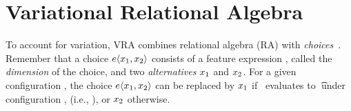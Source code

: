 \section{Variational Relational Algebra}
\label{sec:vrel-alg}

%


To account for variation, VRA combines relational algebra (RA) with 
\emph{choices}~\cite{EW11tosem,HW16fosd,Walk13thesis}.
Remember that a choice $\chc{\elem_1,\elem_2}$ consists of a feature expression \dimMeta, called
the \emph{dimension} of the choice, and 
two \emph{alternatives} $\elem_1$ and $\elem_2$. For a given configuration \config, 
the choice $\chc{\elem_1, \elem_2}$ can be replaced by $\elem_1$ if \dimMeta\
evaluates to \t\ under configuration \config, (i.e., \fSem{\dimMeta}),
or $\elem_2$ otherwise. 




